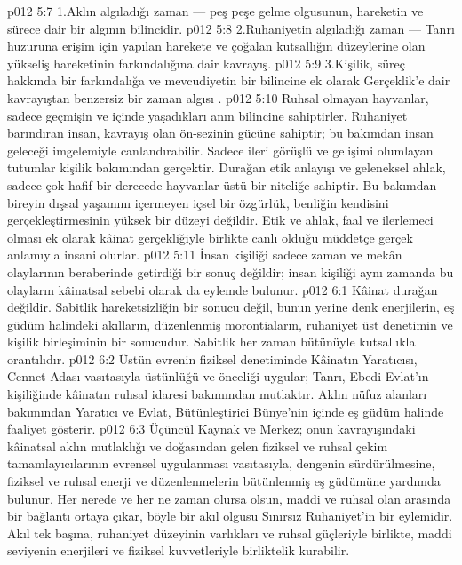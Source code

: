 \vs p012 5:7 1.\bibnobreakspace Aklın algıladığı zaman --- peş peşe gelme olgusunun, hareketin ve sürece dair bir algının bilincidir.
\vs p012 5:8 2.\bibnobreakspace Ruhaniyetin algıladığı zaman --- Tanrı huzuruna erişim için yapılan harekete ve çoğalan kutsallığın düzeylerine olan yükseliş hareketinin farkındalığına dair kavrayış.
\vs p012 5:9 3.\bibnobreakspace Kişilik, süreç hakkında bir farkındalığa ve mevcudiyetin bir bilincine ek olarak Gerçeklik’e dair kavrayıştan benzersiz bir zaman algısı .
\vs p012 5:10 Ruhsal olmayan hayvanlar, sadece geçmişin ve içinde yaşadıkları anın bilincine sahiptirler. Ruhaniyet barındıran insan, kavrayış olan ön\hyp{}sezinin gücüne sahiptir; bu bakımdan insan geleceği imgelemiyle canlandırabilir. Sadece ileri görüşlü ve gelişimi olumlayan tutumlar kişilik bakımından gerçektir. Durağan etik anlayışı ve geleneksel ahlak, sadece çok hafif bir derecede hayvanlar üstü bir niteliğe sahiptir. Bu bakımdan bireyin dışsal yaşamını içermeyen içsel bir özgürlük, benliğin kendisini gerçekleştirmesinin yüksek bir düzeyi değildir. Etik ve ahlak, faal ve ilerlemeci olması ek olarak kâinat gerçekliğiyle birlikte canlı olduğu müddetçe gerçek anlamıyla insani olurlar.
\vs p012 5:11 İnsan kişiliği sadece zaman ve mekân olaylarının beraberinde getirdiği bir sonuç değildir; insan kişiliği aynı zamanda bu olayların kâinatsal sebebi olarak da eylemde bulunur.
\vs p012 6:1 Kâinat durağan değildir. Sabitlik hareketsizliğin bir sonucu değil, bunun yerine denk enerjilerin, eş güdüm halindeki akılların, düzenlenmiş morontiaların, ruhaniyet üst denetimin ve kişilik birleşiminin bir sonucudur. Sabitlik her zaman bütünüyle kutsallıkla orantılıdır.
\vs p012 6:2 Üstün evrenin fiziksel denetiminde Kâinatın Yaratıcısı, Cennet Adası vasıtasıyla üstünlüğü ve önceliği uygular; Tanrı, Ebedi Evlat’ın kişiliğinde kâinatın ruhsal idaresi bakımından mutlaktır. Aklın nüfuz alanları bakımından Yaratıcı ve Evlat, Bütünleştirici Bünye’nin içinde eş güdüm halinde faaliyet gösterir.
\vs p012 6:3 Üçüncül Kaynak ve Merkez; onun kavrayışındaki kâinatsal aklın mutlaklığı ve doğasından gelen fiziksel ve ruhsal çekim tamamlayıcılarının evrensel uygulanması vasıtasıyla, dengenin sürdürülmesine, fiziksel ve ruhsal enerji ve düzenlenmelerin bütünlenmiş eş güdümüne yardımda bulunur. Her nerede ve her ne zaman olursa olsun, maddi ve ruhsal olan arasında bir bağlantı ortaya çıkar, böyle bir akıl olgusu Sınırsız Ruhaniyet’in bir eylemidir. Akıl tek başına, ruhaniyet düzeyinin varlıkları ve ruhsal güçleriyle birlikte, maddi seviyenin enerjileri ve fiziksel kuvvetleriyle birliktelik kurabilir.

